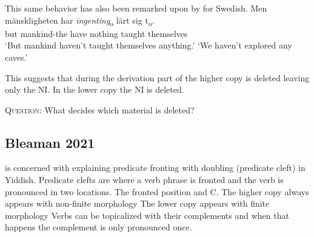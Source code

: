 \documentclass[12pt, letterpaper]{article}
\begin{document}
\ex This same behavior has also been remarked upon by \citet{penkaNegativeIndefinites2011} for Swedish.
	\ea 
	\gll Men mänskligheten har \textit{ingenting}\textsubscript{o} lärt sig t\textsubscript{o}.\\
	but mankind-the have nothing taught themselves\\
	\glt `But mankind haven't taught themselves anything.'
	\glt `We haven't explored any caves.'
	\z 

\ex This suggests that during the derivation part of the higher copy is deleted leaving only the NI. In the lower copy the NI is deleted.
\\
\label{ex:tree}
\z 



\begin{tcolorbox}[width=\linewidth]
\textsc{Question:} What decides which material is deleted?\\
\end{tcolorbox}

\subsection{Bleaman 2021}

\ea \citet{bleamanPredicateFrontingYiddish2021} is concerned with explaining predicate fronting with doubling (predicate cleft) in Yiddish.
	\ea Predicate clefts are where a verb phrase is fronted and the verb is pronounced in two locations. The fronted position and C. 
		\ea The higher copy always appears with non-finite morphology
		\ex The lower copy appears with finite morphology
		\z 
	\z 
\ex Verbs can be topicalized with their complements and when that happens the complement is only pronounced once.
\end{document}
